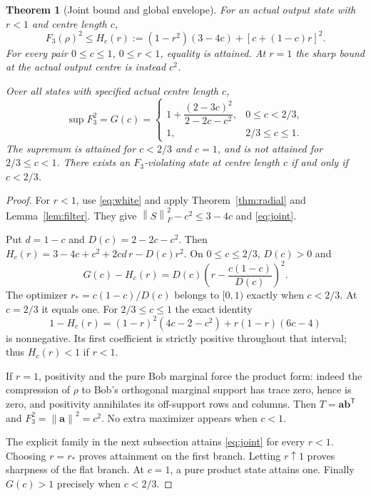 \documentclass[11pt,a4paper]{article}
\newtheorem{theorem}{Theorem}
\theoremstyle{remark}\newtheorem{remark}[theorem]{Remark}
\newcommand{\norm}[1]{\left\lVert#1\right\rVert}
\renewcommand{\aa}{\mathbf a}\newcommand{\bb}{\mathbf b}
\begin{document}
\begin{theorem}[Joint bound and global envelope]\label{thm:global}
For an actual output state with $r<1$ and centre length $c$,
\begin{equation}\label{eq:joint}
F_3(\rho)^2\leq H_c(r):=(1-r^2)(3-4c)+[c+(1-c)r]^2.
\end{equation}
For every pair $0\leq c\leq1$, $0\leq r<1$, equality is attained. At $r=1$
the sharp bound at the actual output centre is instead $c^2$.

Over all states with specified actual centre length $c$,
\begin{equation}\label{eq:global}
\sup F_3^2=G(c)=\begin{cases}
1+\dfrac{(2-3c)^2}{2-2c-c^2},&0\leq c<2/3,\\[5pt]
1,&2/3\leq c\leq1.
\end{cases}
\end{equation}
The supremum is attained for $c<2/3$ and $c=1$, and is not attained for
$2/3\leq c<1$. There exists an $F_3$-violating state at centre length $c$
if and only if $c<2/3$.
\end{theorem}
\begin{proof}
For $r<1$, use \eqref{eq:white} and apply Theorem~\ref{thm:radial} and
Lemma~\ref{lem:filter}. They give
$\norm S_F^2-c^2\leq3-4c$ and \eqref{eq:joint}.

Put $d=1-c$ and $D(c)=2-2c-c^2$. Then
$H_c(r)=3-4c+c^2+2cd\,r-D(c)r^2$. On $0\leq c\leq2/3$, $D(c)>0$ and
\begin{equation}\label{eq:square}
G(c)-H_c(r)=D(c)\left(r-\frac{c(1-c)}{D(c)}\right)^2.
\end{equation}
The optimizer $r_*=c(1-c)/D(c)$ belongs to $[0,1)$ exactly when $c<2/3$.
At $c=2/3$ it equals one. For $2/3\leq c\leq1$ the exact identity
\begin{equation}\label{eq:flat}
1-H_c(r)=(1-r)^2(4c-2-c^2)+r(1-r)(6c-4)
\end{equation}
is nonnegative. Its first coefficient is strictly positive throughout that
interval; thus $H_c(r)<1$ if $r<1$.

If $r=1$, positivity and the pure Bob marginal force the product form:
indeed the compression of $\rho$ to Bob's orthogonal marginal support has
trace zero, hence is zero, and positivity annihilates its off-support rows
and columns. Then $T=\aa\bb^{\mathsf T}$ and
$F_3^2=\norm\aa^2=c^2$. No extra maximizer appears when $c<1$.

The explicit family in the next subsection attains \eqref{eq:joint} for
every $r<1$. Choosing $r=r_*$ proves attainment on the first branch.
Letting $r\uparrow1$ proves sharpness of the flat branch. At $c=1$, a pure
product state attains one. Finally $G(c)>1$ precisely when $c<2/3$.
\end{proof}
\end{document}
